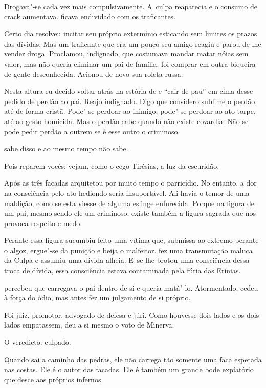 Drogava"-se cada vez mais compulsivamente. A~culpa reaparecia e o consumo
de crack aumentava.  ficava endividado com os traficantes.

Certo dia  resolveu incitar seu próprio extermínio esticando sem
limites os prazos das dívidas. Mas um traficante que era um pouco seu
amigo reagiu e parou de lhe vender droga. Proclamou, indignado, que
costumava mandar matar nóias sem valor, mas não queria eliminar um pai
de família.  foi comprar em outra biqueira de gente desconhecida.
Acionou de novo sua roleta russa.

Nesta altura eu decido voltar atrás na estória de  e ``cair de pau''
em cima desse pedido de perdão ao pai. Reajo indignado. Digo que
considero sublime o perdão, até de forma cristã. Pode"-se perdoar ao
inimigo, pode"-se perdoar ao ato torpe, até ao gesto homicida. Mas o
perdão cabe quando não existe covardia. Não se pode pedir perdão a
outrem se é esse outro o criminoso.

 sabe disso e ao mesmo tempo não sabe.

Pois reparem vocês: vejam, como o cego Tirésias, a luz da escuridão.

Após as três facadas  arquitetou por muito tempo o parricídio. No
entanto, a dor na consciência pelo ato hediondo seria insuportável. Ali
havia o temor de uma maldição, como se esta viesse de alguma esfinge
enfurecida. Porque na figura de um pai, mesmo sendo ele um criminoso,
existe também a figura sagrada que nos provoca respeito e medo.

Perante essa figura  sucumbiu feito uma vítima que, submissa ao
extremo perante o algoz, ergue"-se da punição e beija o malfeitor.  fez
uma transmutação maluca da Culpa e assumiu uma dívida alheia. E~se lhe
brotou uma consciência dessa troca de dívida, essa consciência estava
contaminada pela fúria das Erínias.

 percebeu que carregava o pai dentro de si e queria matá"-lo.
Atormentado, cedeu à força do ódio, mas antes fez um julgamento de si
próprio.

Foi juiz, promotor, advogado de defesa e júri. Como houvesse dois lados
e os dois lados empatassem,  deu a si mesmo o voto de Minerva.

O veredicto: culpado.

\asterisc{}

Quando  sai a caminho das pedras, ele não carrega tão somente uma faca
espetada nas costas. Ele é o autor das facadas. Ele é também um grande
bode expiatório que desce aos próprios infernos.

